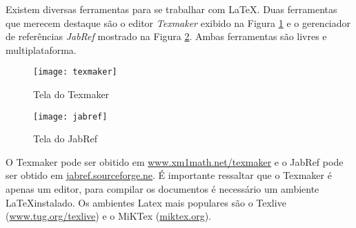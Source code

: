 Existem diversas ferramentas para se trabalhar com \LaTeX. Duas ferramentas que merecem destaque são o editor \textit{Texmaker} exibido na Figura \ref{figura:texmaker} e o gerenciador de referências \textit{JabRef} mostrado na Figura \ref{figura:jabref}. Ambas ferramentas são livres e multiplataforma.

\begin{figure}[htb]
\caption{Tela do Texmaker}
 \label{figura:texmaker}
 \centering
 \texttt{[image: texmaker]}
\end{figure}

\begin{figure}[htb]
 \caption{Tela do JabRef}
 \label{figura:jabref}
 \centering
 \texttt{[image: jabref]}
\end{figure}

O Texmaker pode ser obitido em \url{www.xm1math.net/texmaker} e o JabRef pode ser obtido em \url{jabref.sourceforge.ne}. É importante ressaltar que o Texmaker é apenas um editor, para compilar os documentos é necessário um ambiente \LaTeX instalado. Os ambientes Latex mais populares são o Texlive (\url{www.tug.org/texlive}) e o MiKTex (\url{miktex.org}).